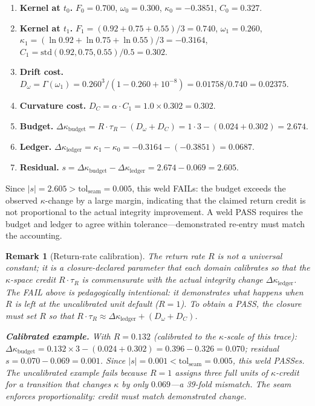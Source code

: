 \documentclass[
  aps,
  prd,
  twocolumn,
  superscriptaddress,
  nofootinbib,
  floatfix
]{revtex4-2}
\newtheorem{remark}{Remark}
\newcommand{\tR}{\tau_{\!R}}
\newcommand{\Gam}{\Gamma}
\newcommand{\tolseam}{\mathrm{tol}_{\mathrm{seam}}}
\newcommand{\regime}[1]{\textrm{\upshape\scshape#1}}
\begin{document}
\begin{enumerate}[leftmargin=*,label=\textbf{\arabic*.}]
\item \textbf{Kernel at $t_0$.}
  $F_0 = 0.700$, $\omega_0 = 0.300$, $\kappa_0 = -0.3851$,
  $C_0 = 0.327$.
\item \textbf{Kernel at $t_1$.}
  $F_1 = (0.92 + 0.75 + 0.55)/3 = 0.740$,
  $\omega_1 = 0.260$,
  $\kappa_1 = (\ln 0.92 + \ln 0.75 + \ln 0.55)/3 = -0.3164$,
  $C_1 = \mathrm{std}(0.92, 0.75, 0.55)/0.5 = 0.302$.
\item \textbf{Drift cost.}
  $D_\omega = \Gam(\omega_1) = 0.260^3/(1 - 0.260 + 10^{-8})
  = 0.01758/0.740 = 0.02375$.
\item \textbf{Curvature cost.}
  $D_C = \alpha \cdot C_1 = 1.0 \times 0.302 = 0.302$.
\item \textbf{Budget.}
  $\Delta\kappa_{\mathrm{budget}} = R \cdot \tR - (D_\omega + D_C)
  = 1 \cdot 3 - (0.024 + 0.302) = 2.674$.
\item \textbf{Ledger.}
  $\Delta\kappa_{\mathrm{ledger}} = \kappa_1 - \kappa_0
  = -0.3164 - (-0.3851) = 0.0687$.
\item \textbf{Residual.}
  $s = \Delta\kappa_{\mathrm{budget}} - \Delta\kappa_{\mathrm{ledger}}
  = 2.674 - 0.069 = 2.605$.
\end{enumerate}

\noindent Since $|s| = 2.605 > \tolseam = 0.005$, this weld
\regime{FAIL}s: the budget exceeds the observed
$\kappa$-change by a large margin, indicating that the claimed
return credit is not proportional to the actual integrity
improvement.  A weld \regime{PASS} requires the budget and
ledger to agree within tolerance---demonstrated re-entry must
match the accounting.

\begin{remark}[Return-rate calibration]
\label{rem:calibration}
The return rate $R$ is not a universal constant; it is a
\emph{closure-declared parameter} that each domain calibrates so
that the $\kappa$-space credit $R \cdot \tR$ is commensurate with
the actual integrity change $\Delta\kappa_{\mathrm{ledger}}$.
The \regime{FAIL} above is pedagogically intentional: it
demonstrates what happens when $R$ is left at the uncalibrated
unit default ($R = 1$).  To obtain a \regime{PASS}, the closure
must set $R$ so that $R \cdot \tR \approx
\Delta\kappa_{\mathrm{ledger}} + (D_\omega + D_C)$.

\medskip\noindent\textbf{Calibrated example.}
With $R = 0.132$ (calibrated to the $\kappa$-scale of this
trace): $\Delta\kappa_{\mathrm{budget}} = 0.132 \times 3
- (0.024 + 0.302) = 0.396 - 0.326 = 0.070$; residual
$s = 0.070 - 0.069 = 0.001$.  Since
$|s| = 0.001 < \tolseam = 0.005$, this weld \regime{PASS}es.
The uncalibrated example fails because $R = 1$ assigns three
full units of $\kappa$-credit for a transition that changes
$\kappa$ by only $0.069$---a 39-fold mismatch.  The seam
enforces proportionality: credit must match demonstrated change.
\end{remark}
\end{document}
